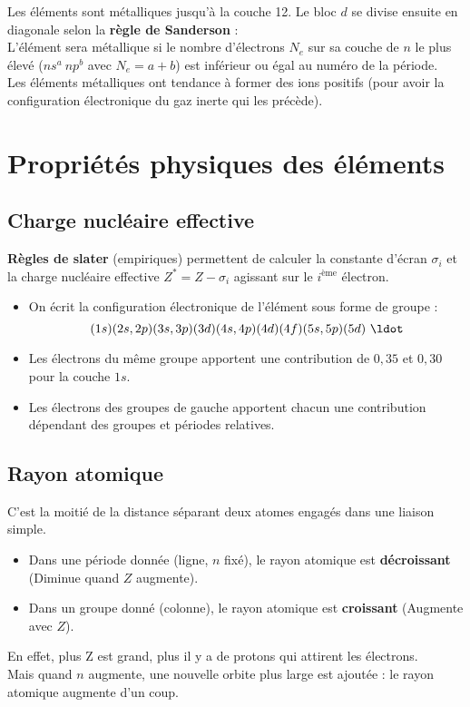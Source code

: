\documentclass[13pt, twoside, a4paper, french, tikz]{report}
\begin{document}
    Les éléments sont métalliques jusqu'à la couche 12.
    Le bloc $d$ se divise ensuite en diagonale selon la \textbf{règle de Sanderson} :\\
    L'élément sera métallique si le nombre d'électrons $N_e$ sur sa couche de $n$ le plus élevé ($ns^a\ np^b$ avec $N_e = a + b$) est inférieur ou égal au numéro de la période.\\
    Les éléments métalliques ont tendance à former des ions positifs (pour avoir la configuration électronique du gaz inerte qui les précède).


\chapter{Propriétés physiques des éléments}\label{ch:propriete-physique-des-elements}
  
  
  \section{Charge nucléaire effective}\label{sec:charge-nucleaire-effective}
    
    \textbf{Règles de slater} (empiriques) permettent de calculer la constante d'écran $\sigma_i$ et la charge nucléaire effective $Z^* = Z - \sigma_i$ agissant sur le $i^{\text{ème}}$ électron.\\
    
    \begin{itemize}
      \item On écrit la configuration électronique de l'élément sous forme de groupe : \[(1s)(2s, 2p)(3s, 3p)(3d)(4s, 4p)(4d)(4f)(5s, 5p)(5d)\ \ldot\]
      \item Les électrons du même groupe apportent une contribution de $0,35$ et $0,30$ pour la couche $1s$.
      \item Les électrons des groupes de gauche apportent chacun une contribution dépendant des groupes et périodes relatives.
    \end{itemize}
  
  
  \section{Rayon atomique}\label{sec:rayon-atomique}
    
    C'est la moitié de la distance séparant deux atomes engagés dans une liaison simple.
    \begin{itemize}
      \item Dans une période donnée (ligne, $n$ fixé), le rayon atomique est \textbf{décroissant} (Diminue quand $Z$ augmente).
      \item Dans un groupe donné (colonne), le rayon atomique est \textbf{croissant} (Augmente avec $Z$).
    \end{itemize}
    \vspace{7pt}
    En effet, plus Z est grand, plus il y a de protons qui attirent les électrons.\\
    Mais quand $n$ augmente, une nouvelle orbite plus large est ajoutée : le rayon atomique augmente d'un coup.
  
\end{document}
